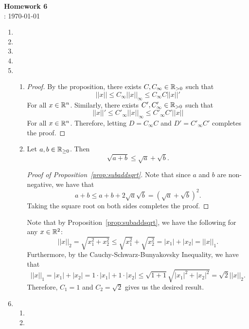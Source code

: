 \documentclass[12pt]{article}
\title{}
\author{Josh Morales}
\date{\today}
\begin{document}
\pagestyle{fancy}
\begin{center}
\textbf{\Large Homework 6} \\
: \today
\end{center}
\begin{enumerate}[leftmargin=2em]
    \item 

    \item

    \item 

    \item 


    \item
    \begin{enumerate}[leftmargin=!]
        \item 
        \begin{proof}
            By the proposition, there exists $C, C_{\infty}\in \mathbb{R}_{>0}$ such that
            \[||x||\leq C_{\infty} ||x||_{\infty}\leq C_{\infty} C ||x||'\]
            For all $x\in \mathbb{R}^{n}$. Similarly, there exists $C',C'_{\infty}\in \mathbb{R}_{>0}$ such that 
            \[||x||' \leq C'_{\infty} ||x||_{\infty} \leq C'_{\infty} C' ||x||\]
            For all $x\in \mathbb{R}^n$. Therefore, letting $D=C_{\infty}C$ and $D'=  C'_{\infty} C'$ completes the proof.
        \end{proof}
        \item 
        \begin{proposition}\label{prop:subaddsqrt}
            Let $a,b\in \mathbb{R}_{\geq 0}$. Then
            \[\sqrt{a+b} \leq \sqrt{a}+\sqrt{b}.\]
        \end{proposition}
        \begin{proof}[Proof of Proposition~\ref{prop:subaddsqrt}]
            Note that since $a$ and $b$ are non-negative, we have that
            \[a+b \leq a+b+2\sqrt{a}\sqrt{b} = {(\sqrt{a}+\sqrt{b})}^2.\]
            Taking the square root on both sides completes the proof.
        \end{proof}

        Note that by Proposition~\ref{prop:subaddsqrt}, we have the following for any $x\in \mathbb{R}^2$:
        \[||x||_{2}=\sqrt{x_1^2+x_2^2} \leq \sqrt{x_1^2}+\sqrt{x_2^2} = |x_1|+|x_2| = ||x||_{1}.\]
        Furthermore, by the Cauchy-Schwarz-Bunyakovsky Inequality, we have that
        \[||x||_{1} = |x_1|+|x_2| = 1\cdot |x_1|+1\cdot|x_2| \leq \sqrt{1+1}\sqrt{|x_1|^2+|x_2|^2} = \sqrt{2}||x||_{2}.\]
        Therefore, $C_1=1$ and $C_2 = \sqrt{2}$ gives us the desired result.
    \end{enumerate}

    \item
    \begin{enumerate}[leftmargin=!]
        \item 

        \item
    \end{enumerate}
    
\end{enumerate}
\end{document}
